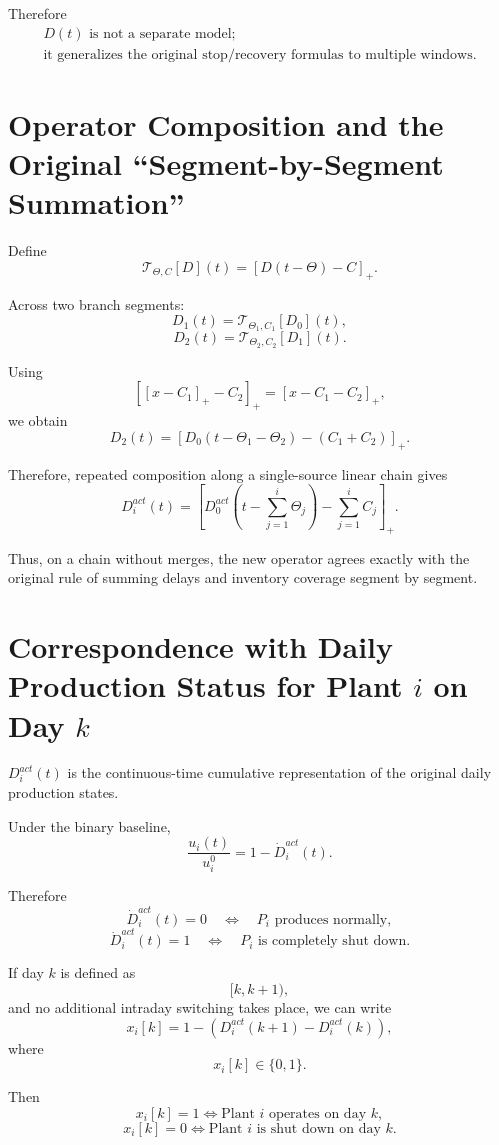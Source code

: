 \documentclass[11pt]{article}
\begin{document}
Therefore
\[
\boxed{\begin{gathered}
\text{\(D(t)\) is not a separate model;}\\
\text{it generalizes the original stop/recovery formulas to multiple windows.}
\end{gathered}}
\tag{25}
\]

\section{Operator Composition and the Original ``Segment-by-Segment Summation''}

Define
\[
\mathcal T_{\Theta,C}[D](t)
=
[D(t-\Theta)-C]_+.
\]

Across two branch segments:
\[
D_1(t)
=
\mathcal T_{\Theta_1,C_1}[D_0](t),
\]
\[
D_2(t)
=
\mathcal T_{\Theta_2,C_2}[D_1](t).
\]

Using
\[
[[x-C_1]_+-C_2]_+
=
[x-C_1-C_2]_+,
\]
we obtain
\[
\boxed{
D_2(t)
=
\left[
D_0(t-\Theta_1-\Theta_2)
-(C_1+C_2)
\right]_+.
}
\tag{26}
\]

Therefore, repeated composition along a single-source linear chain gives
\[
\boxed{
D_i^{act}(t)
=
\left[
D_0^{act}
\left(
t-\sum_{j=1}^{i}\Theta_j
\right)
-
\sum_{j=1}^{i}C_j
\right]_+.
}
\tag{27}
\]

Thus, on a chain without merges, the new operator
agrees exactly with the original rule of summing delays and inventory coverage segment by segment.

\section{Correspondence with Daily Production Status for Plant \(i\) on Day \(k\)}

\(D_i^{act}(t)\) is the continuous-time cumulative representation of the original daily production states.

Under the binary baseline,
\[
\boxed{
\frac{u_i(t)}{u_i^0}
=
1-\dot D_i^{act}(t).
}
\tag{28}
\]

Therefore
\[
\dot D_i^{act}(t)=0
\quad\Longleftrightarrow\quad
P_i\text{ produces normally},
\]
\[
\dot D_i^{act}(t)=1
\quad\Longleftrightarrow\quad
P_i\text{ is completely shut down}.
\]

If day \(k\) is defined as
\[
[k,k+1),
\]
and no additional intraday switching takes place, we can write
\[
\boxed{
x_i[k]
=
1-
\left(
D_i^{act}(k+1)-D_i^{act}(k)
\right),
}
\tag{29}
\]
where
\[
x_i[k]\in\{0,1\}.
\]

Then
\[
\boxed{
x_i[k]=1
\Longleftrightarrow
\text{Plant \(i\) operates on day \(k\)},
}
\]
\[
\boxed{
x_i[k]=0
\Longleftrightarrow
\text{Plant \(i\) is shut down on day \(k\)}.
}
\]
\end{document}
